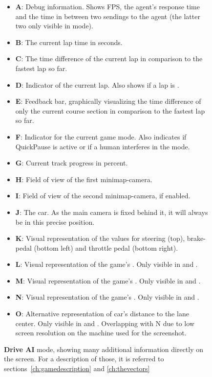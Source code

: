 \begin{figure}[h!t]
	\caption{\textbf{Drive AI} mode, showing many additional information directly on the screen. For a description of those, it is referred to sections~\ref{ch:gamedescription} and \ref{ch:thevectors}}
	\label{fig:aidriveshot}
	\begin{itemize}
		\small
		\setlength\itemsep{0.1em}
		\item \textbf{A}: Debug information. Shows FPS, the agent's response time and the time in between two sendings to the agent (the latter two only visible in  mode).
		\item \textbf{B}: The current lap time in seconds.
		\item \textbf{C}: The time difference of the current lap in comparison to the fastest lap so far.
		\item \textbf{D}: Indicator of the current lap. Also shows if a lap is .
		\item \textbf{E}: Feedback bar, graphically visualizing the time difference of only the current course section in comparison to the fastest lap so far.
		\item \textbf{F}: Indicator for the current game mode. Also indicates if QuickPause is active or if a human interferes in the  mode.
		\item \textbf{G}: Current track progress in percent.
		\item \textbf{H}: Field of view of the first minimap-camera.
		\item \textbf{I}: Field of view of the second minimap-camera, if enabled.
		\item \textbf{J}: The car. As the main camera is fixed behind it, it will always be in this precise position.
		\item \textbf{K}: Visual representation of the values for steering (top), brake-pedal (bottom left) and throttle pedal (bottom right).
		\item \textbf{L}: Visual representation of the game's . Only visible in  and .
		\item \textbf{M}: Visual representation of the game's . Only visible in  and .
		\item \textbf{N}: Visual representation of the game's . Only visible in  and .
		\item \textbf{O}: Alternative representation of car's distance to the lane center. Only visible in  and . Overlapping with N due to low screen resolution on the machine used for the screenshot.

\end{itemize}
\end{figure}
